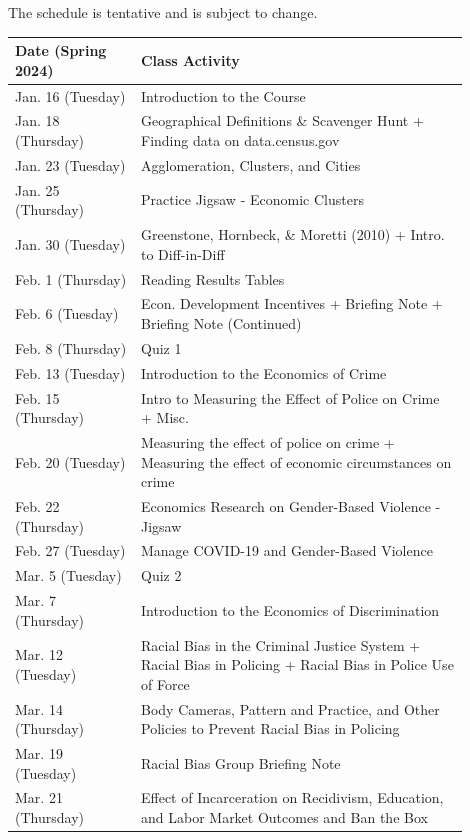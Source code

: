 \documentclass[11pt,letterpaper,final]{article}
\begin{document}
The schedule is tentative and is subject to change. 

\begin{table}[H]
\centering
{}
\begin{tabular}{@{}p{0.25\linewidth}p{0.65\linewidth}@{}}
\toprule
\textbf{Date (Spring 2024)} & \textbf{Class Activity} \\
\midrule
Jan. 16 (Tuesday) & Introduction to the Course \\
Jan. 18 (Thursday) & Geographical Definitions \& Scavenger Hunt + Finding data on data.census.gov \\
Jan. 23 (Tuesday) & Agglomeration, Clusters, and Cities \\
Jan. 25 (Thursday) & Practice Jigsaw - Economic Clusters \\
Jan. 30 (Tuesday) & Greenstone, Hornbeck, \& Moretti (2010) + Intro. to Diff-in-Diff \\
Feb. 1 (Thursday) & Reading Results Tables \\
Feb. 6 (Tuesday) & Econ. Development Incentives + Briefing Note + Briefing Note (Continued) \\
Feb. 8 (Thursday) & Quiz 1 \\
Feb. 13 (Tuesday) & Introduction to the Economics of Crime \\
Feb. 15 (Thursday) & Intro to Measuring the Effect of Police on Crime + Misc. \\
Feb. 20 (Tuesday) & Measuring the effect of police on crime + Measuring the effect of economic circumstances on crime \\
Feb. 22 (Thursday) & Economics Research on Gender-Based Violence - Jigsaw \\
Feb. 27 (Tuesday) & Manage COVID-19 and Gender-Based Violence \\
Mar. 5 (Tuesday) & Quiz 2 \\
Mar. 7 (Thursday) & Introduction to the Economics of Discrimination \\
Mar. 12 (Tuesday) & Racial Bias in the Criminal Justice System + Racial Bias in Policing + Racial Bias in Police Use of Force \\
Mar. 14 (Thursday) & Body Cameras, Pattern and Practice, and Other Policies to Prevent Racial Bias in Policing \\
Mar. 19 (Tuesday) & Racial Bias Group Briefing Note \\
Mar. 21 (Thursday) & Effect of Incarceration on Recidivism, Education, and Labor Market Outcomes and Ban the Box\\

\end{tabular}
\end{table}
\end{document}

